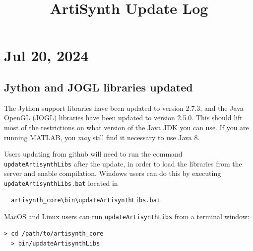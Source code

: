 \documentclass{article}
\title{ArtiSynth Update Log}
\date{}
\begin{document}
\iflatexml
\else
\maketitle
\fi

%
%
%





\section*{Jul 20, 2024}

\subsection{Jython and JOGL libraries updated}

The Jython support libraries have been updated to version 2.7.3, and the Java
OpenGL (JOGL) libraries have been updated to version 2.5.0. This should lift
most of the restrictions on what version of the Java JDK you can use. If you
are running MATLAB, you {\it may} still find it necessary to use Java 8.

Users updating from github will need to run the command {\tt
updateArtisynthLibs} after the update, in order to load the libraries from the
server and enable compilation. Windows users can do this by executing {\tt
updateArtisynthLibs.bat} located in
%
\begin{verbatim}
  artisynth_core\bin\updateArtisynthLibs.bat
\end{verbatim}
%
MacOS and Linux users can run {\tt updateArtisynthLibs} from
a terminal window:
%
\begin{lstlisting}[]
  > cd /path/to/artisynth_core
  > bin/updateArtisynthLibs
\end{lstlisting}
%
\end{document}
